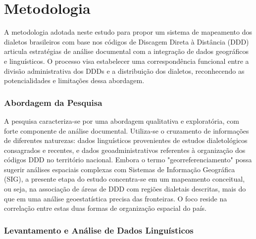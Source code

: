 \chapter{Metodologia}


A metodologia adotada neste estudo para propor um sistema de mapeamento dos dialetos brasileiros com base nos códigos de Discagem Direta à Distância (DDD) articula estratégias de análise documental com a integração de dados geográficos e linguísticos. O processo visa estabelecer uma correspondência funcional entre a divisão administrativa dos DDDs e a distribuição dos dialetos, reconhecendo as potencialidades e limitações dessa abordagem.





\subsection{Abordagem da Pesquisa}


A pesquisa caracteriza-se por uma abordagem qualitativa e exploratória, com forte componente de análise documental. Utiliza-se o cruzamento de informações de diferentes naturezas: dados linguísticos provenientes de estudos dialetológicos consagrados e recentes, e dados geoadministrativos referentes à organização dos códigos DDD no território nacional. Embora o termo "georreferenciamento" possa sugerir análises espaciais complexas com Sistemas de Informação Geográfica (SIG), a presente etapa do estudo concentra-se em um mapeamento conceitual, ou seja, na associação de áreas de DDD com regiões dialetais descritas, mais do que em uma análise geoestatística precisa das fronteiras. O foco reside na correlação entre estas duas formas de organização espacial do país.

\subsection{Levantamento e Análise de Dados Linguísticos}


